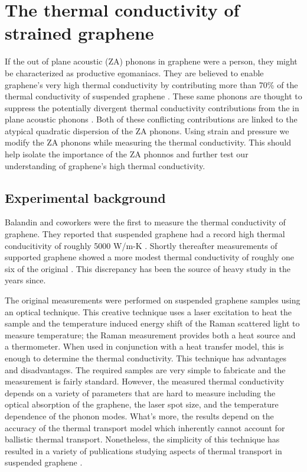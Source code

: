 \chapter{The thermal conductivity of strained graphene\label{chap:therm}}
If the out of plane acoustic (ZA) phonons in graphene were a person, they might be characterized as productive egomaniacs.
They are believed to enable graphene's very high thermal conductivity by contributing more than 70\% of the thermal conductivity of suspended graphene \cite{Lindsay2010}.
These same phonons are thought to suppress the potentially divergent thermal conductivity contributions from the in plane acoustic phonons \cite{Pereira2013,Bonini2012}.
Both of these conflicting contributions are linked to the atypical quadratic dispersion of the ZA phonons.
Using strain and pressure we modify the ZA phonons while measuring the thermal conductivity.
This should help isolate the importance of the ZA phonnos and further test our understanding of graphene's high thermal conductivity.

\section{Experimental background \label{sect:therm:Exp}}
Balandin and coworkers were the first to measure the thermal conductivity of gra\-phene.
They reported that suspended graphene had a record high thermal conducitivity of roughly 5000 W/m-K \cite{Balandin2008}.
Shortly thereafter measurements of supported graphene showed a more modest thermal conductivity of roughly one six of the original \cite{Seol2010}.
This discrepancy has been the source of heavy study in the years since.

The original measurements were performed on suspended graphene samples using an optical technique.
This creative technique uses a laser excitation to heat the sample and the temperature induced energy shift of the Raman scattered light to measure temperature; the Raman measurement provides both a heat source and a thermometer.
When used in conjunction with a heat transfer model, this is enough to determine the thermal conductivity.
This technique has advantages and disadvantages.
The required samples are very simple to fabricate and the measurement is fairly standard.
However, the measured thermal conductivity depends on a variety of parameters that are hard to measure including the optical absorption of the graphene, the laser spot size, and the temperature dependence of the phonon modes.
What's more, the results depend on the accuracy of the thermal transport model which inherently cannot account for ballistic thermal transport.
Nonetheless, the simplicity of this technique has resulted in a variety of publications studying aspects of thermal transport in suspended graphene \cite{Balandin2008,Faugeras2010,Cai2010,Ghosh2010,Lee2011,Chen2011a,Chen2012}.

